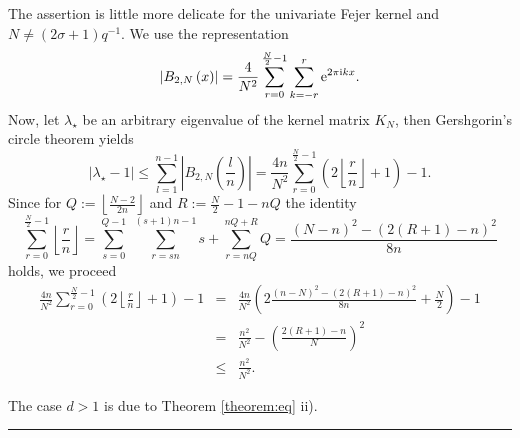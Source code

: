 \documentclass[11pt,a4paper,bibtotoc]{scrartcl}
\def\ti{\mbox{\scriptsize{\rm i}}}
\newcommand{\eip}[1]{{\rm e}^{ 2\pi{\ti} #1}}
\renewcommand{\Box}{\hspace*{0ex} \hfill \rule{1.5ex}{1.5ex} \\ \goodbreak}
\numberwithin{equation}{section}
\numberwithin{table}{section}
\numberwithin{figure}{section}
\begin{document}
The assertion is little more delicate for the univariate Fejer kernel and
$N\neq\left(2\sigma+1\right)q^{-1}$.
We use the representation
\begin{equation*}
  \left|B_{2,N}\left(x\right)\right| = \frac{4}{N^2}
  \sum\limits_{r=0}^{\frac{N}{2}-1} \sum\limits_{k=-r}^{r} \eip{kx}.
\end{equation*}
Now, let $\lambda_{\star}$ be an arbitrary eigenvalue of the kernel matrix
$K_N$, then Gershgorin's circle theorem yields
\begin{equation*}
  \left|\lambda_{\star}-1\right|
  \le \sum_{l=1}^{n-1}\left|B_{2,N}\left(\frac{l}{n}\right)\right|
   = \frac{4n}{N^2} \sum\limits_{r=0}^{\frac{N}{2}-1}
   \left(2\left\lfloor \frac{r}{n} \right\rfloor+1\right) - 1.
\end{equation*}
Since for $Q:=\left\lfloor\frac{N-2}{2n}\right\rfloor$ and $R:=\frac{N}{2}-1-nQ$ the identity
\begin{equation*}
  \sum\limits_{r=0}^{\frac{N}{2}-1}\left\lfloor \frac{r}{n} \right\rfloor
  =\sum\limits_{s=0}^{Q-1}\;\sum\limits_{r=sn}^{\left(s+1\right)n-1} s + \sum_{r=nQ}^{nQ+R} Q
  =\frac{\left(N-n\right)^2 - \left(2\left(R+1\right)-n\right)^2}{8n}
\end{equation*}
holds, we proceed
\begin{eqnarray*}
  \frac{4n}{N^2} \sum\limits_{r=0}^{\frac{N}{2}-1}
  \left(2\left\lfloor \frac{r}{n} \right\rfloor+1\right) - 1
  &= &\frac{4n}{N^2} \left(2 \frac{\left(n-N\right)^2 - \left(2\left(R+1\right)-n\right)^2}{8n} + \frac{N}{2}\right) - 1\\
  &= &\frac{n^2}{N^2}-\left(\frac{2\left(R+1\right)-n}{N}\right)^2\\
  &\le & \frac{n^2}{N^2}.
\end{eqnarray*}

The case $d>1$ is due to Theorem \ref{theorem:eq} ii).
\Box
\end{document}
